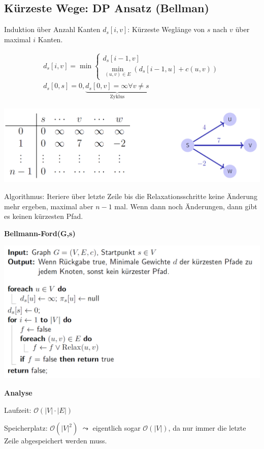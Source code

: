 \begin{sectionbox}
\subsection{Kürzeste Wege: DP Ansatz (Bellman)}\smallskip
Induktion über Anzahl Kanten $d_{s}[i, v]$: Kürzeste Weglänge von $s$ nach $v$ über maximal $i$ Kanten.\par\vspace{-3px}
\begin{equation*}
\begin{array}{l}
d_{s}[i, v]=\min \left\{\begin{array}{l} d_{s}[i-1, v] \\ \min _{(u, v) \in E}\left(d_{s}[i-1, u]+c(u, v)\right)\end{array}\right. \\
d_{s}[0, s]=0, \underbrace{d_{s}[0, v]=\infty \forall v \neq s}_{\text{Zyklus}}
\end{array}
\end{equation*}\par\smallskip
\begin{center}
    \includegraphics[width = 0.9\columnwidth]{../img/BellFordSym.png}
\end{center}\smallskip
Algorithmus: Iteriere über letzte Zeile bis die Relaxationsschritte keine Änderung mehr ergeben, maximal aber $n − 1$ mal. Wenn dann noch Änderungen, dann gibt es keinen kürzesten Pfad.\par\vspace{7px}

\textbf{Bellmann-Ford(G,s)}\par
\includegraphics[width = \columnwidth]{../img/BellFord.png}\smallskip

\textbf{Analyse}\par
Laufzeit: $\mathcal{O}(|V| \cdot |E|)$\par
Speicherplatz: $\mathcal{O}(|V|^2)$ $\leadsto$ eigentlich sogar $\mathcal{O}(|V|)$, da nur immer die letzte Zeile abgespeichert werden muss.\smallskip
\end{sectionbox}